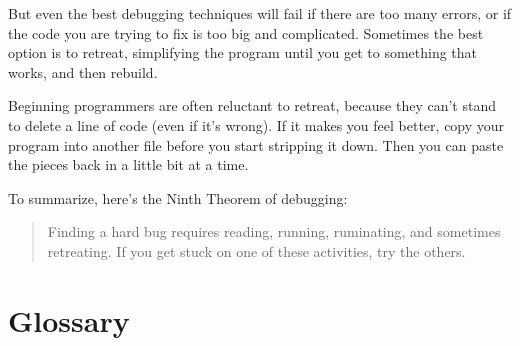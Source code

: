 \documentclass{book}
\begin{document}
But even the best debugging techniques will fail if there are too many
errors, or if the code you are trying to fix is too big and
complicated. Sometimes the best option is to retreat, simplifying the
program until you get to something that works, and then rebuild.

Beginning programmers are often reluctant to retreat, because
they can't stand to delete a line of code (even if it's wrong).
If it makes you feel better, copy your program into another file
before you start stripping it down. Then you can paste the pieces
back in a little bit at a time.

To summarize, here's the Ninth Theorem of debugging:

\begin{quote}
Finding a hard bug requires reading, running, ruminating, and
sometimes retreating. If you get stuck on one of these activities,
try the others.
\end{quote}



\section{Glossary}
\end{document}
